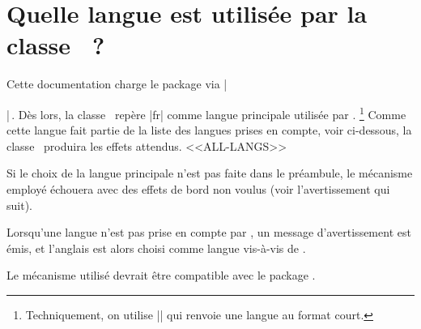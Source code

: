 \documentclass[10pt, a4paper]{main}
\begin{document}
\section{Quelle langue est utilisée par la classe \thisproj\ ?}

Cette documentation charge le package  via \tdocinlatex|\usepackage[french]{babel}|\,.
Dès lors, la classe \thisproj\ repère \tdocinlatex|fr| comme langue principale utilisée par .%
\footnote{
	Techniquement, on utilise \tdocinlatex|| qui renvoie une langue au format court.
}
Comme cette langue fait partie de la liste des langues prises en compte, voir ci-dessous, la classe \thisproj\ produira les effets attendus.
<<ALL-LANGS>>


\begin{tdoccaut}
	Si le choix de la langue principale n'est pas faite dans le préambule, le mécanisme employé échouera avec des effets de bord non voulus (voir l'avertissement qui suit).
\end{tdoccaut}


\begin{tdocwarn}
    Lorsqu'une langue n'est pas prise en compte par \thisproj, un message d'avertissement est émis, et l'anglais est alors choisi comme langue vis-à-vis de \thisproj.
\end{tdocwarn}


\begin{tdocnote}
    Le mécanisme utilisé devrait être compatible avec le package .
\end{tdocnote}
\end{document}
